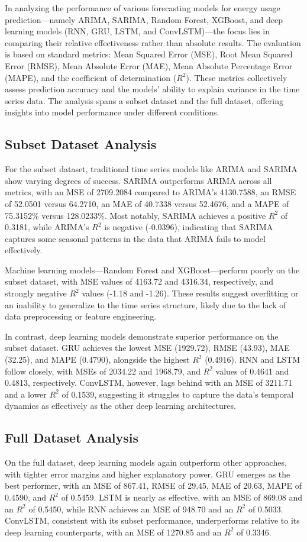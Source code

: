 In analyzing the performance of various forecasting models for energy usage prediction—namely ARIMA, SARIMA, Random Forest, XGBoost, and deep learning models (RNN, GRU, LSTM, and ConvLSTM)—the focus lies in comparing their relative effectiveness rather than absolute results. The evaluation is based on standard metrics: Mean Squared Error (MSE), Root Mean Squared Error (RMSE), Mean Absolute Error (MAE), Mean Absolute Percentage Error (MAPE), and the coefficient of determination ($R^2$). These metrics collectively assess prediction accuracy and the models’ ability to explain variance in the time series data. The analysis spans a subset dataset and the full dataset, offering insights into model performance under different conditions.

\subsection{Subset Dataset Analysis}
For the subset dataset, traditional time series models like ARIMA and SARIMA show varying degrees of success. SARIMA outperforms ARIMA across all metrics, with an MSE of 2709.2084 compared to ARIMA’s 4130.7588, an RMSE of 52.0501 versus 64.2710, an MAE of 40.7338 versus 52.4676, and a MAPE of 75.3152\% versus 128.0233\%. Most notably, SARIMA achieves a positive $R^2$ of 0.3181, while ARIMA’s $R^2$ is negative (-0.0396), indicating that SARIMA captures some seasonal patterns in the data that ARIMA fails to model effectively.

Machine learning models—Random Forest and XGBoost—perform poorly on the subset dataset, with MSE values of 4163.72 and 4316.34, respectively, and strongly negative $R^2$ values (-1.18 and -1.26). These results suggest overfitting or an inability to generalize to the time series structure, likely due to the lack of data preprocessing or feature engineering.

In contrast, deep learning models demonstrate superior performance on the subset dataset. GRU achieves the lowest MSE (1929.72), RMSE (43.93), MAE (32.25), and MAPE (0.4790), alongside the highest $R^2$ (0.4916). RNN and LSTM follow closely, with MSEs of 2034.22 and 1968.79, and $R^2$ values of 0.4641 and 0.4813, respectively. ConvLSTM, however, lags behind with an MSE of 3211.71 and a lower $R^2$ of 0.1539, suggesting it struggles to capture the data’s temporal dynamics as effectively as the other deep learning architectures.

\subsection{Full Dataset Analysis}
On the full dataset, deep learning models again outperform other approaches, with tighter error margins and higher explanatory power. GRU emerges as the best performer, with an MSE of 867.41, RMSE of 29.45, MAE of 20.63, MAPE of 0.4590, and $R^2$ of 0.5459. LSTM is nearly as effective, with an MSE of 869.08 and an $R^2$ of 0.5450, while RNN achieves an MSE of 948.70 and an $R^2$ of 0.5033. ConvLSTM, consistent with its subset performance, underperforms relative to its deep learning counterparts, with an MSE of 1270.85 and an $R^2$ of 0.3346.

